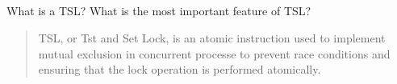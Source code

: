 \subsection*{} What is a TSL? What is the most important feature of TSL?
    \begin{quote}
        TSL, or Tst and Set Lock, is an atomic instruction used to implement mutual exclusion in concurrent processe to prevent race conditions and ensuring that the lock operation is performed atomically.
    \end{quote}
    
    